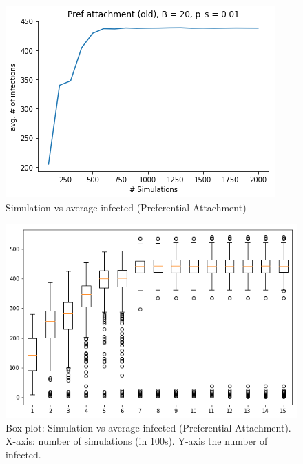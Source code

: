\begin{figure}[!h]
    \centering
    \includegraphics[scale = 0.6]{Figuresnew/simulations.png}
    \caption{Simulation vs average infected (Preferential Attachment)}
    \label{fig:pa_simvsavg}
\end{figure}
 
\begin{figure}[!h]
    \centering
    \includegraphics[scale = 0.4]{Figuresnew/boxplotpa.png}
    \caption{Box-plot: Simulation vs average infected (Preferential Attachment). X-axis: number of simulations (in 100s). Y-axis the number of infected.}
    \label{fig:pa_boxplot}
\end{figure}





